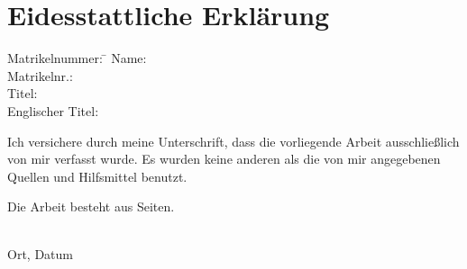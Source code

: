 \section*{Eidesstattliche Erklärung}

\begin{tabbing}
	Matrikelnummer: \= \kill
	Name: \> \thesisAuthor\\
	Matrikelnr.: \> \Matrikelnummer\\
	Titel: \> \thesisTitle\\
	Englischer Titel: \> \thesisTitleEnglish\\
\end{tabbing}

Ich versichere durch meine Unterschrift, dass die vorliegende Arbeit ausschließlich von mir verfasst wurde.
Es wurden keine anderen als die von mir angegebenen Quellen und Hilfsmittel benutzt.

Die Arbeit besteht aus \underline{\hspace{3em}} Seiten.

\vspace{6ex}
\begin{tabbing}
\underline{\hspace{14em}} \hspace{3em}\= \underline{\hspace{14em}} \\
Ort, Datum \> \thesisAuthor
\end{tabbing}